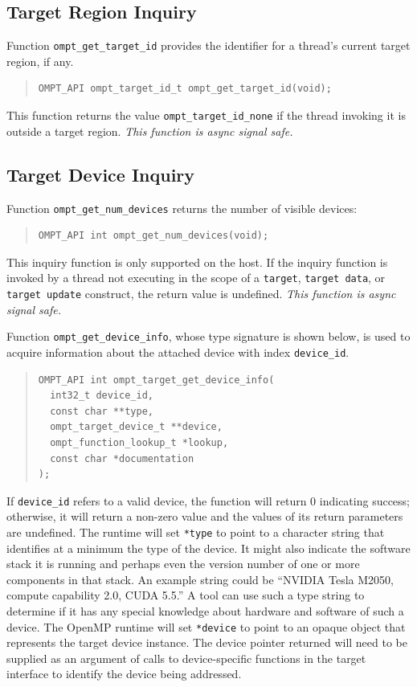 \documentclass{article}
\begin{document}
\subsection{Target Region Inquiry}
\label{sec:target-region}

Function \verb|ompt_get_target_id| provides the identifier for a thread's current target region, if any.
\begin{quote}
\begin{verbatim}
OMPT_API ompt_target_id_t ompt_get_target_id(void);
\end{verbatim}
\end{quote}
This function returns the value \verb|ompt_target_id_none| if the thread invoking it is outside a target region.  {\em This function is async signal safe.}

\subsection{Target Device Inquiry}
\label{sec:target-device}
Function \verb|ompt_get_num_devices| returns the number of visible devices:
\begin{quote}
\begin{verbatim}
OMPT_API int ompt_get_num_devices(void);
\end{verbatim}
\end{quote}
This inquiry function is only supported on the host. If the inquiry function is invoked by a thread not executing in the scope of a {\tt target}, {\tt target data}, or {\tt target update} construct, the return value is undefined. {\it This function is async signal safe.}

Function \verb|ompt_get_device_info|, whose type signature is shown below, is used to acquire information about the attached device with  index \verb|device_id|. 
\begin{quote}
\begin{verbatim}
OMPT_API int ompt_target_get_device_info(
  int32_t device_id, 
  const char **type, 
  ompt_target_device_t **device,
  ompt_function_lookup_t *lookup,
  const char *documentation
);
\end{verbatim}
\end{quote}
If \verb|device_id| refers to a valid device, the function will return 0 indicating success; otherwise, it will return a non-zero value and the values of its return parameters are undefined. The runtime will set \verb|*type| to point to a character string that identifies at a minimum the  type of the device. It might also indicate the software stack it is running and perhaps even the version number of one or more components in that stack. An example string could be ``NVIDIA Tesla M2050, compute capability 2.0, CUDA 5.5.'' A tool can use such a type string to determine if it has any special knowledge about hardware and software of such a device. The OpenMP runtime will set \verb|*device| to point to an opaque object that represents the target device instance. The device pointer returned will need to be supplied as an argument of calls to device-specific functions in the target interface to identify the device being addressed.
\end{document}
